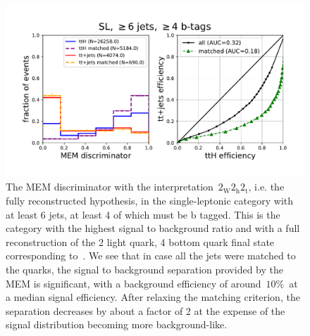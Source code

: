 \begin{figure}
\begin{centering}
\includegraphics[width = 1.0\textwidth]{figures/mem_sl_jge6_tge4.pdf}
\caption{The MEM discriminator with the interpretation~$2_{\mathrm{W}} 2_{\mathrm{h}} 2_{\mathrm{t}}$, i.e. the fully reconstructed hypothesis, in the single-leptonic category with at least 6 jets, at least 4 of which must be b tagged. This is the category with the highest signal to background ratio and with a full reconstruction of the 2 light quark, 4 bottom quark final state corresponding to~\ttHbb. We see that in case all the jets were matched to the quarks, the signal to background separation provided by the MEM is significant, with a background efficiency of around~$10\%$~at a median signal efficiency. After relaxing the matching criterion, the separation decreases by about a factor of 2 at the expense of the signal distribution becoming more background-like.}
\label{fig:mem_sl_jge6_tge4}
\end{centering}
\end{figure}

